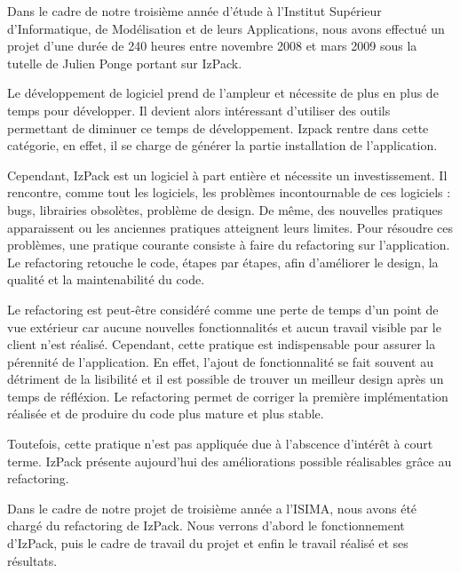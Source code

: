 Dans le cadre de notre troisième année d'étude à l'Institut Supérieur d'Informatique, de Modélisation et de leurs Applications, nous avons effectué un projet d'une durée de 240 heures entre novembre 2008 et mars 2009 sous la tutelle de Julien Ponge portant sur IzPack.

Le développement de logiciel prend de l'ampleur et nécessite de plus en plus de temps pour développer.
Il devient alors intéressant d'utiliser des outils permettant de diminuer ce temps de développement.
Izpack rentre dans cette catégorie, en effet, il se charge de générer la partie installation de l'application.

Cependant, IzPack est un logiciel à part entière et nécessite un investissement.
Il rencontre, comme tout les logiciels, les problèmes incontournable de ces logiciels : bugs, librairies obsolètes, problème de design.
De même, des nouvelles pratiques apparaissent ou les anciennes pratiques atteignent leurs limites.
Pour résoudre ces problèmes, une pratique courante consiste à faire du refactoring sur l'application.
Le refactoring retouche le code, étapes par étapes, afin d'améliorer le design, la qualité et la maintenabilité du code.

Le refactoring est peut-être considéré comme une perte de temps d'un point de vue extérieur car aucune nouvelles fonctionnalités et aucun travail visible par le client n'est réalisé.
Cependant, cette pratique est indispensable pour assurer la pérennité de l'application. 
En effet, l'ajout de fonctionnalité se fait souvent au détriment de la lisibilité et il est possible de trouver un meilleur design après un temps de réfléxion.
Le refactoring permet de corriger la première implémentation réalisée et de produire du code plus mature et plus stable.

Toutefois, cette pratique n'est pas appliquée due à l'abscence d'intérêt à court terme.
IzPack présente aujourd'hui des améliorations possible réalisables grâce au refactoring.

Dans le cadre de notre projet de troisième année a l'ISIMA, nous avons été chargé du refactoring de IzPack. 
Nous verrons d'abord le fonctionnement d'IzPack, puis le cadre de travail du projet et enfin le travail réalisé et ses résultats.
